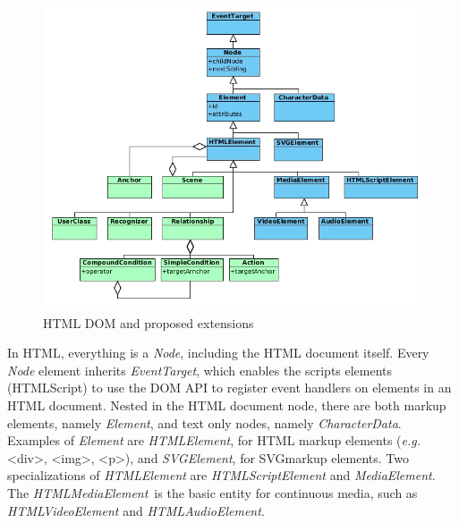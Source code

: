 \documentclass[
  doutorado,
  american
]{ThesisPUC}
\newcommand{\captionvspace}{\vspace{-1.3em}}
\begin{document}

\begin{figure}[h]
  \begin{center}
    \includegraphics[width=12cm, keepaspectratio]{img/img12.png}
    \captionvspace
    \caption{HTML DOM and proposed extensions}
    \label{fig:htmldom}
    \captionvspace
  \end{center}
\end{figure}

In HTML, everything is a \textit{Node}, including the HTML document itself.
Every \textit{Node} element inherits \textit{EventTarget}, which enables the
scripts elements (HTMLScript) to use the DOM API to register event handlers on
elements in an HTML document. Nested in the HTML document node, there are both
markup elements, namely \textit{Element}, and text only nodes, namely
\textit{CharacterData}. Examples of \textit{Element} are \textit{HTMLElement}, 
for HTML markup
elements (\textit{e.g.} <div>, <img>, <p>), and 
\textit{SVGElement}, for SVG\footnotemark markup elements. Two specializations 
of \textit{HTMLElement} are \textit{HTMLScriptElement} and 
\textit{MediaElement}. The \textit{HTMLMediaElement}\footnotemark~is the basic 
entity for continuous media, such as \textit{HTMLVideoElement} and 
\textit{HTMLAudioElement}.
\end{document}
